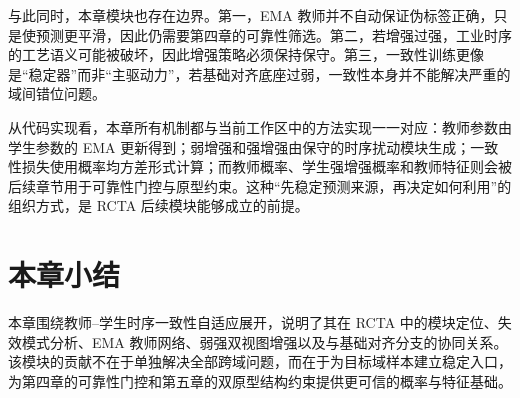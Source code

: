 与此同时，本章模块也存在边界。第一，EMA 教师并不自动保证伪标签正确，只是使预测更平滑，因此仍需要第四章的可靠性筛选。第二，若增强过强，工业时序的工艺语义可能被破坏，因此增强策略必须保持保守。第三，一致性训练更像是“稳定器”而非“主驱动力”，若基础对齐底座过弱，一致性本身并不能解决严重的域间错位问题。

从代码实现看，本章所有机制都与当前工作区中的方法实现一一对应：教师参数由学生参数的 EMA 更新得到；弱增强和强增强由保守的时序扰动模块生成；一致性损失使用概率均方差形式计算；而教师概率、学生强增强概率和教师特征则会被后续章节用于可靠性门控与原型约束。这种“先稳定预测来源，再决定如何利用”的组织方式，是 RCTA 后续模块能够成立的前提。

\section{本章小结}
本章围绕教师--学生时序一致性自适应展开，说明了其在 RCTA 中的模块定位、失效模式分析、EMA 教师网络、弱强双视图增强以及与基础对齐分支的协同关系。该模块的贡献不在于单独解决全部跨域问题，而在于为目标域样本建立稳定入口，为第四章的可靠性门控和第五章的双原型结构约束提供更可信的概率与特征基础。
